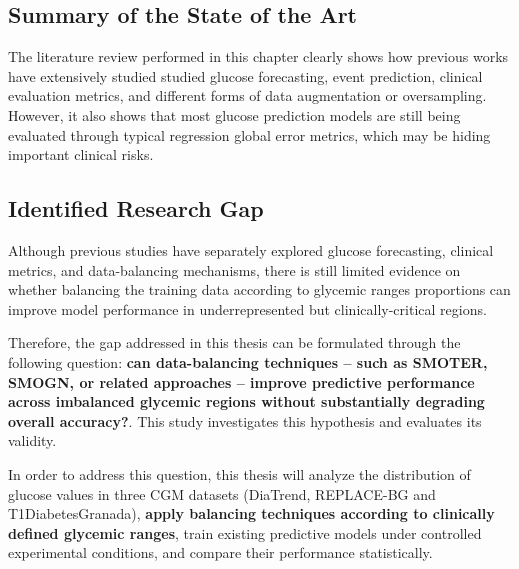 \subsection{Summary of the State of the Art}
\label{subsec:soa_summary}

The literature review performed in this chapter clearly shows how previous works have extensively studied studied glucose forecasting, event prediction, clinical evaluation metrics, and different forms of data augmentation or oversampling. However, it also shows that most glucose prediction models are still being evaluated through typical regression global error metrics, which may be hiding important clinical risks.

\subsection{Identified Research Gap}
\label{subsec:research_gap}

Although previous studies have separately explored glucose forecasting, clinical metrics, and data-balancing mechanisms, there is still limited evidence on whether balancing the training data according to glycemic ranges proportions can improve model performance in underrepresented but clinically-critical regions.

Therefore, the gap addressed in this thesis can be formulated through the following question: \textbf{can data-balancing techniques -- such as SMOTER, SMOGN, or related approaches -- improve predictive performance across imbalanced glycemic regions without substantially degrading overall accuracy?}. This study investigates this hypothesis and evaluates its validity.

In order to address this question, this thesis will analyze the distribution of glucose values in three CGM datasets (DiaTrend, REPLACE-BG and T1DiabetesGranada), \textbf{apply balancing techniques according to clinically defined glycemic ranges}, train existing predictive models under controlled experimental conditions, and compare their performance statistically.
